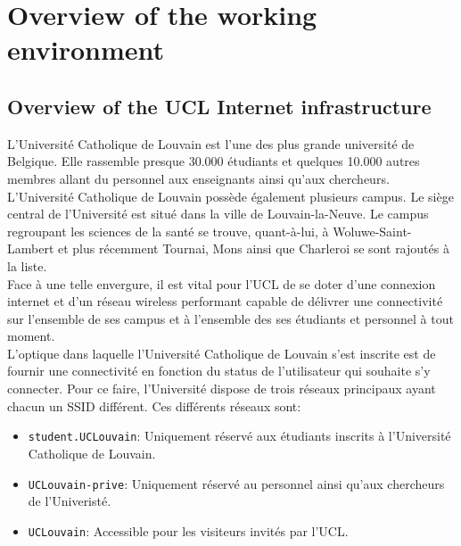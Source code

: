 
\chapter{Overview of the working environment} %

\label{Chapter2} %



\section{Overview of the UCL Internet infrastructure}
L'Université Catholique de Louvain est l'une des plus grande université de Belgique. Elle rassemble presque 30.000 étudiants et quelques 10.000 autres membres allant du personnel aux enseignants ainsi qu'aux chercheurs.\\
L'Université Catholique de Louvain possède également plusieurs campus. Le siège central de l'Université est situé dans la ville de Louvain-la-Neuve. Le campus regroupant les sciences de la santé se trouve, quant-à-lui, à Woluwe-Saint-Lambert et plus récemment Tournai, Mons ainsi que Charleroi se sont rajoutés à la liste.\\
Face à une telle envergure, il est vital pour l'UCL de se doter d'une connexion internet et d'un réseau wireless performant capable de délivrer une connectivité sur l'ensemble de ses campus et à l'ensemble des ses étudiants et personnel à tout moment.\\
L'optique dans laquelle l'Université Catholique de Louvain s'est inscrite est de fournir une connectivité en fonction du status de l'utilisateur qui souhaite s'y connecter. Pour ce faire, l'Université dispose de trois réseaux principaux ayant chacun un SSID différent. Ces différents réseaux sont:
\begin{itemize}
	\item \texttt{student.UCLouvain}: Uniquement réservé aux étudiants inscrits à l'Université Catholique de Louvain.
	\item \texttt{UCLouvain-prive}: Uniquement réservé au personnel ainsi qu'aux chercheurs de l'Univeristé.
	\item \texttt{UCLouvain}: Accessible pour les visiteurs invités par l'UCL.
\end{itemize}

